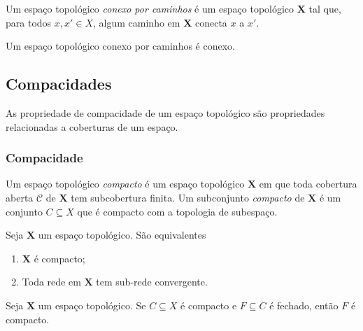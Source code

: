 \begin{definition}
Um espaço topológico \emph{conexo por caminhos} é um espaço topológico $\bm X$ tal que, para todos $x,x' \in X$, algum caminho em $\bm X$ conecta $x$ a $x'$.
\end{definition}

\begin{exercise}
Um espaço topológico conexo por caminhos é conexo.
\end{exercise}




















\subsection{Compacidades}

As propriedade de compacidade de um espaço topológico são propriedades relacionadas a coberturas de um espaço.

\subsubsection{Compacidade}

\begin{definition}
Um espaço topológico \emph{compacto} é um espaço topológico $\bm X$ em que toda cobertura aberta $\mathcal C$ de $\bm X$ tem subcobertura finita. Um subconjunto \emph{compacto} de $\bm X$ é um conjunto $C \subseteq X$ que é compacto com a topologia de subespaço.
\end{definition}

\begin{proposition}
Seja $\bm X$ um espaço topológico. São equivalentes
	\begin{enumerate}
	\item $\bm X$ é compacto;
	\item Toda rede em $\bm X$ tem sub-rede convergente.
	\end{enumerate}
\end{proposition}

\begin{proposition}
Seja $\bm X$ um espaço topológico. Se $C \subseteq X$ é compacto e $F \subseteq C$ é fechado, então $F$ é compacto.
\end{proposition}

